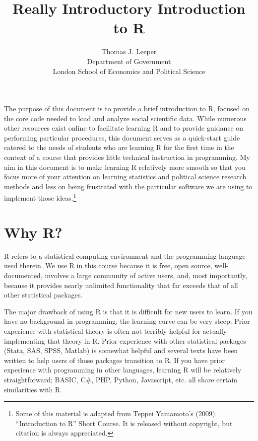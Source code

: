 \documentclass[12pt]{article}\usepackage[]{graphicx}\usepackage[]{color}
\title{Really Introductory Introduction to R}
\author{Thomas J. Leeper\\
Department of Government\\
London School of Economics and Political Science}
\begin{document}
\maketitle




{\abstract The purpose of this document is to provide a brief introduction to R, focused on the core code needed to load and analyze social scientific data. While numerous other resources exist online to facilitate learning R and to provide guidance on performing particular procedures, this document serves as a quick-start guide catered to the needs of students who are learning R for the first time in the context of a course that provides little technical instruction in programming. My aim in this document is to make learning R relatively more smooth so that you focus more of your attention on learning statistics and political science research methods and less on being frustrated with the particular software we are using to implement those ideas.\footnote{Some of this material is adapted from Teppei Yamamoto's (2009) ``Introduction to R'' Short Course. It is released without copyright, but citation is always appreciated.}}

\section{Why R?}\label{sec:intro}
R refers to a statistical computing environment and the programming language used therein. We use R in this course because it is free, open source, well-documented, involves a large community of active users, and, most importantly, because it provides nearly unlimited functionality that far exceeds that of all other statistical packages.

The major drawback of using R is that it is difficult for new users to learn. If you have no background in programming, the learning curve can be very steep. Prior experience with statistical theory is often not terribly helpful for actually implementing that theory in R. Prior experience with other statistical packages (Stata, SAS, SPSS, Matlab) is somewhat helpful and several texts have been written to help users of those packages transition to R. If you have prior experience with programming in other languages, learning R will be relatively straightforward; BASIC, C\#, PHP, Python, Javascript, etc. all share certain similarities with R.
\end{document}
